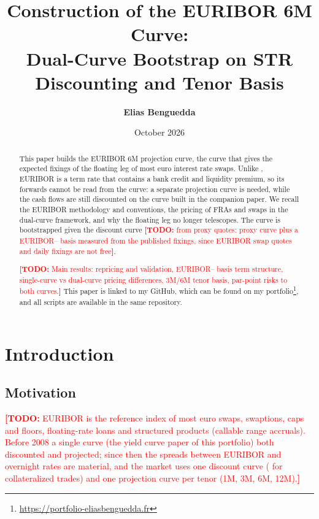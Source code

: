 \documentclass[11pt,a4paper]{article}
\title{\textbf{Construction of the EURIBOR 6M Curve:\\
Dual-Curve Bootstrap on \texteuro STR Discounting and Tenor Basis}}
\author{\textbf{Elias Benguedda}}
\date{October 2026}
\theoremstyle{plain}
\theoremstyle{definition}
\newcommand{\estr}{\text{\texteuro STR}}
\newcommand{\todo}[1]{\textcolor{red}{\textbf{[TODO:} #1\textbf{]}}}
\begin{document}
\maketitle

\begin{abstract}
This paper builds the EURIBOR 6M projection curve, the curve that gives the expected fixings of the floating leg of most euro interest rate swaps. Unlike \estr{}, EURIBOR is a term rate that contains a bank credit and liquidity premium, so its forwards cannot be read from the \estr{} curve: a separate projection curve is needed, while the cash flows are still discounted on the \estr{} curve built in the companion paper. We recall the EURIBOR methodology and conventions, the pricing of FRAs and swaps in the dual-curve framework, and why the floating leg no longer telescopes. The curve is bootstrapped given the \estr{} discount curve \todo{from proxy quotes: \estr{} proxy curve plus a EURIBOR--\estr{} basis measured from the published fixings, since EURIBOR swap quotes and daily fixings are not free}.

\todo{Main results: repricing and validation, EURIBOR--\estr{} basis term structure, single-curve vs dual-curve pricing differences, 3M/6M tenor basis, par-point risks to both curves.} This paper is linked to my GitHub, which can be found on my portfolio\footnote{\url{https://portfolio-eliasbenguedda.fr}}, and all scripts are available in the same repository.
\end{abstract}

\clearpage

\tableofcontents
\newpage

\section{Introduction}
\label{sec:intro}

\subsection{Motivation}
\todo{EURIBOR is the reference index of most euro swaps, swaptions, caps and floors, floating-rate loans and structured products (callable range accruals). Before 2008 a single curve (the yield curve paper of this portfolio) both discounted and projected; since then the spreads between EURIBOR and overnight rates are material, and the market uses one discount curve (\estr{} for collateralized trades) and one projection curve per tenor (1M, 3M, 6M, 12M).}
\end{document}
